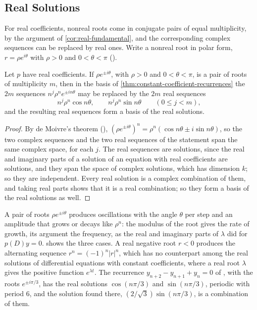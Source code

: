 \subsection{Real Solutions}

For real coefficients, nonreal roots come in conjugate pairs of equal multiplicity, by the argument of \cref{cor:real-fundamental}, and the corresponding complex sequences can be replaced by real ones. Write a nonreal root in polar form, $r=\rho e^{i\theta}$ with $\rho>0$ and $0<\theta<\pi$ ().

\begin{corollary}
\label{cor:real-recurrence-solutions}
Let $p$ have real coefficients. If $\rho e^{\pm i\theta}$, with $\rho>0$ and $0<\theta<\pi$, is a pair of roots of multiplicity $m$, then in the basis of \cref{thm:constant-coefficient-recurrences} the $2m$ sequences $n^j\rho^ne^{\pm in\theta}$ may be replaced by the $2m$ real sequences
\[
n^j\rho^n\cos n\theta,\qquad n^j\rho^n\sin n\theta\qquad(0\le j<m),
\]
and the resulting real sequences form a basis of the real solutions.
\end{corollary}

\begin{proof}
By de Moivre's theorem (), $(\rho e^{\pm i\theta})^n=\rho^n(\cos n\theta\pm i\sin n\theta)$, so the two complex sequences and the two real sequences of the statement span the same complex space, for each $j$. The real sequences are solutions, since the real and imaginary parts of a solution of an equation with real coefficients are solutions, and they span the space of complex solutions, which has dimension $k$; so they are independent. Every real solution is a complex combination of them, and taking real parts shows that it is a real combination; so they form a basis of the real solutions as well.
\end{proof}

A pair of roots $\rho e^{\pm i\theta}$ produces oscillations with the angle $\theta$ per step and an amplitude that grows or decays like $\rho^n$: the modulus of the root gives the rate of growth, its argument the frequency, as the real and imaginary parts of $\lambda$ did for $p(D)y=0$.  shows the three cases. A real negative root $r<0$ produces the alternating sequence $r^n=(-1)^n|r|^n$, which has no counterpart among the real solutions of differential equations with constant coefficients, where a real root $\lambda$ gives the positive function $e^{\lambda t}$. The recurrence $y_{n+2}-y_{n+1}+y_n=0$ of , with the roots $e^{\pm i\pi/3}$, has the real solutions $\cos(n\pi/3)$ and $\sin(n\pi/3)$, periodic with period $6$, and the solution found there, $(2/\sqrt3)\sin(n\pi/3)$, is a combination of them.

